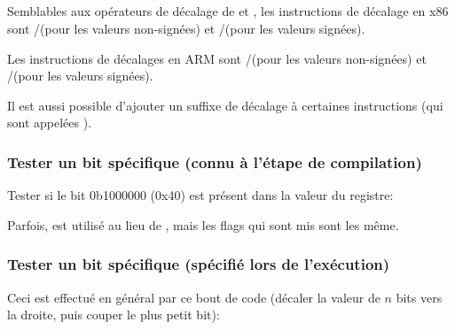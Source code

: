 ﻿%
\subsection{\Conclusion{}}


Semblables aux opérateurs de décalage de \CCpp \TT{$\ll$} et \TT{$\gg$}, les instructions
de décalage en x86 sont \SHR/\SHL (pour les valeurs non-signées) et \SAR/\SHL (pour
les valeurs signées).


Les instructions de décalages en ARM sont \LSR/\LSL (pour les valeurs non-signées)
et \ASR/\LSL (pour les valeurs signées).

Il est aussi possible d'ajouter un suffixe de décalage à certaines instructions (qui
sont appelées ).

\subsubsection{Tester un bit spécifique (connu à l'étape de compilation)}

Tester si le bit 0b1000000 (0x40) est présent dans la valeur du registre:










Parfois, \AND est utilisé au lieu de \TEST, mais les flags qui sont mis sont les
même.

\subsubsection{Tester un bit spécifique (spécifié lors de l'exécution)}

Ceci est effectué en général par ce bout de code \CCpp (décaler la valeur de $n$
bits vers la droite, puis couper le plus petit bit):

